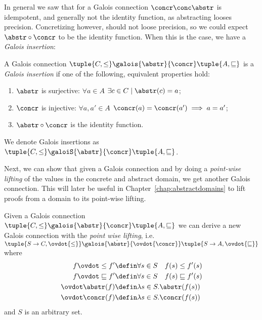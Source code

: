 In general we saw that for a Galois connection \(\concr \conc \abstr\)
is idempotent, and generally not the identity function, as abstracting
looses precision. Concretizing however, should not loose precision, so
we could expect \(\abstr \circ \concr\) to be the identity
function. When this is the case, we have a \emph{Galois insertion}:

\begin{definition}\label{def:insertion}
  A Galois
  connection \(\tuple{C, \leq} \galois{\abstr}{\concr} \tuple{A,
    \sqsubseteq}\) is a \emph{Galois insertion} if one of the
  following, equivalent properties hold:
  \begin{enumerate}
  \item \(\abstr\) is surjective: \(\forall a \in A\)
    \(\exists c \in C \mid \abstr(c) = a\);
  \item \(\concr\) is injective: \(\forall a, a'\in A\)
    \(\concr(a) = \concr(a') \implies a = a'\);
  \item \(\abstr \circ \concr\) is the identity function.
  \end{enumerate}
  We denote Galois insertions as
  \(\tuple{C, \leq} \galoiS{\abstr}{\concr} \tuple{A, \sqsubseteq}\).
\end{definition}

Next, we can show that given a Galois connection and by doing a
\emph{point-wise lifting} of the values in the concrete and abstract
domain, we get another Galois connection. This will later be useful in
Chapter~\ref{chap:abstractdomains} to lift proofs from a domain to its
point-wise lifting.

\begin{theorem}\label{th:pointwiseconn}
  Given a Galois connection
  \(\tuple{C, \leq} \galois{\abstr}{\concr} \tuple{A, \sqsubseteq}\)
  we can derive a new Galois connection with the \emph{point wise
    lifting}, i.e.
  \(\tuple{S\to C, \ovdot{\leq}} \galois{\dot\abstr}{\ovdot{\concr}}
  \tuple{S\to A, \ovdot{\sqsubseteq}}\) where
  \begin{align*}
    f \ovdot\leq f' & \defin \forall s \in S \quad f(s) \leq f'(s)\\
    f \ovdot\sqsubseteq f' & \defin \forall s \in S \quad f(s) \sqsubseteq f'(s)\\
    \ovdot\abstr(f) & \defin \lambda s \in S . \abstr(f(s)) \\
    \ovdot\concr(f) & \defin \lambda s \in S . \concr(f(s)) \\
  \end{align*}
  and \(S\) is an arbitrary set.
\end{theorem}

